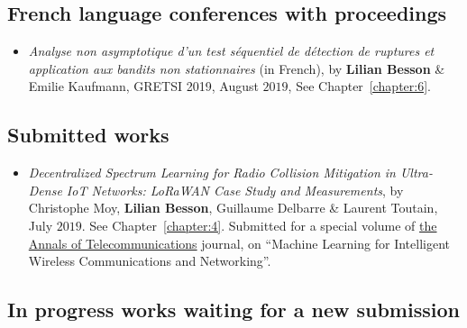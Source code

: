 \subsection*{French language conferences with proceedings}

\begin{itemize}
\item
    \emph{Analyse non asymptotique d'un test séquentiel de détection de ruptures et application aux bandits non stationnaires} (in French),
    by \textbf{Lilian Besson} \& Emilie Kaufmann,
    GRETSI 2019,
    August $2019$,
    See Chapter~\ref{chapter:6}.
    \cite{Besson2019Gretsi}

\end{itemize}


\subsection*{Submitted works}

\begin{itemize}

\item
    \emph{Decentralized Spectrum Learning for Radio Collision Mitigation in Ultra-Dense IoT Networks: LoRaWAN Case Study and Measurements},
    by Christophe Moy, \textbf{Lilian Besson}, Guillaume Delbarre \& Laurent Toutain,
    July $2019$.
    See Chapter~\ref{chapter:4}.
    Submitted for a special volume of \href{https://annalsoftelecommunications.wp.imt.fr/}{the Annals of Telecommunications} journal, on ``Machine Learning for Intelligent Wireless Communications and Networking''.
    \cite{MoyBesson2019Annales}


\end{itemize}


\subsection*{In progress works waiting for a new submission}

